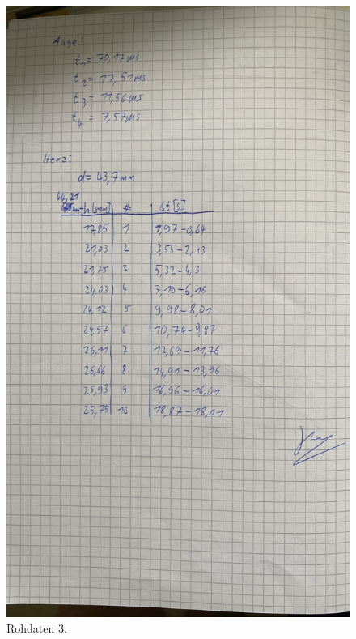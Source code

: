 \begin{figure}[H]
  \includegraphics[width=\textwidth]{Bilder/messdaten3.jpg}
  \caption{Rohdaten 3.}
  \label{fig:3}
\end{figure}


